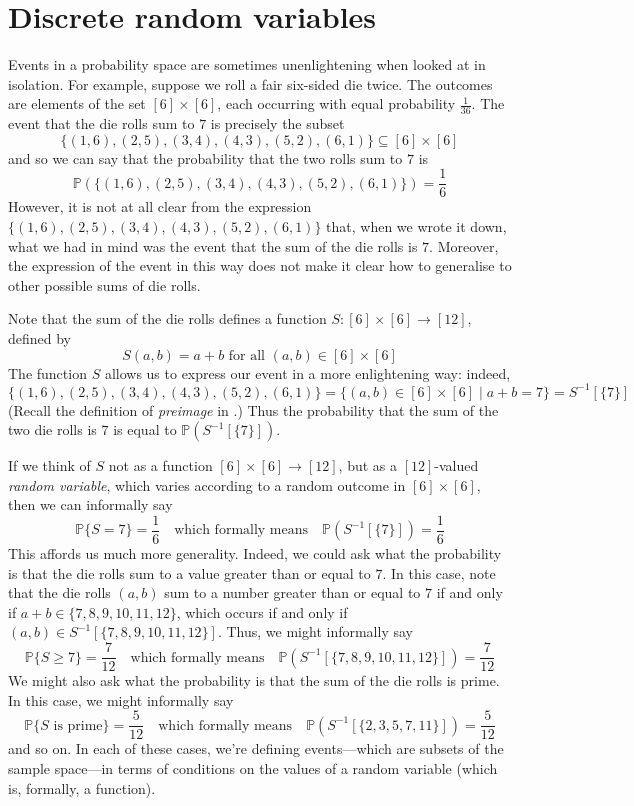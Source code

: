\section{Discrete random variables}

Events in a probability space are sometimes unenlightening when looked at in isolation. For example, suppose we roll a fair six-sided die twice. The outcomes are elements of the set $[6] \times [6]$, each occurring with equal probability $\frac{1}{36}$. The event that the die rolls sum to $7$ is precisely the subset
\[ \{ (1,6), (2,5), (3,4), (4,3), (5,2), (6,1) \} \subseteq [6] \times [6] \]
and so we can say that the probability that the two rolls sum to $7$ is
\[ \mathbb{P}( \{ (1,6), (2,5), (3,4), (4,3), (5,2), (6,1) \}) = \frac{1}{6} \]
However, it is not at all clear from the expression $\{ (1,6), (2,5), (3,4), (4,3), (5,2), (6,1) \}$ that, when we wrote it down, what we had in mind was the event that the sum of the die rolls is $7$. Moreover, the expression of the event in this way does not make it clear how to generalise to other possible sums of die rolls.

Note that the sum of the die rolls defines a function $S : [6] \times [6] \to [12]$, defined by
\[ S(a,b) = a+b \text{ for all } (a,b) \in [6] \times [6] \]
The function $S$ allows us to express our event in a more enlightening way: indeed,
\[ \{ (1,6), (2,5), (3,4), (4,3), (5,2), (6,1) \} = \{ (a,b) \in [6] \times [6] \mid a+b=7 \} = S^{-1}[\{7\}] \]
(Recall the definition of \textit{preimage} in .) Thus the probability that the sum of the two die rolls is $7$ is equal to $\mathbb{P}(S^{-1}[\{7\}])$.

If we think of $S$ not as a function $[6] \times [6] \to [12]$, but as a $[12]$-valued \textit{random variable}, which varies according to a random outcome in $[6] \times [6]$, then we can informally say
\[ \mathbb{P}\{S = 7\} = \frac{1}{6} \quad \text{which formally means} \quad \mathbb{P}(S^{-1}[\{7\}]) = \frac{1}{6} \]
This affords us much more generality. Indeed, we could ask what the probability is that the die rolls sum to a value greater than or equal to $7$. In this case, note that the die rolls $(a,b)$ sum to a number greater than or equal to $7$ if and only if $a+b \in \{7,8,9,10,11,12\}$, which occurs if and only if $(a,b) \in S^{-1}[\{7,8,9,10,11,12\}]$. Thus, we might informally say
\[ \mathbb{P}\{S \ge 7\} = \frac{7}{12} \quad \text{which formally means} \quad \mathbb{P}(S^{-1}[\{7,8,9,10,11,12\}]) = \frac{7}{12} \]
We might also ask what the probability is that the sum of the die rolls is prime. In this case, we might informally say
\[ \mathbb{P}\{S \text{ is prime}\} = \frac{5}{12} \quad \text{which formally means} \quad \mathbb{P}(S^{-1}[\{2,3,5,7,11\}])  = \frac{5}{12} \]
and so on. In each of these cases, we're defining events---which are subsets of the sample space---in terms of conditions on the values of a random variable (which is, formally, a function).

